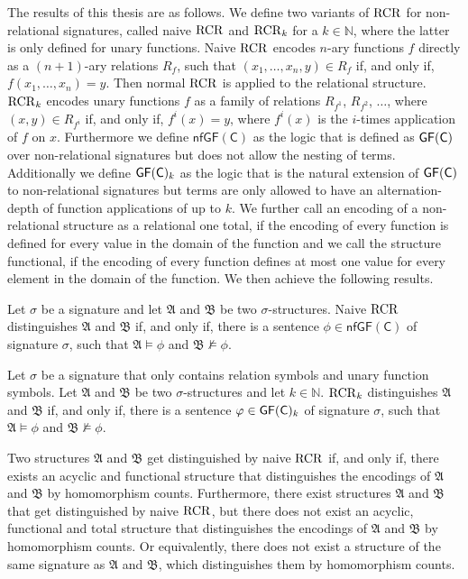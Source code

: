 The results of this thesis are as follows.
We define two variants of $\operatorname{RCR}$ for non-relational signatures, called naive $\operatorname{RCR}$ and $\operatorname{RCR}_k$ for a $k\in\mathbb{N}$, where the latter is only defined for unary functions.
Naive $\operatorname{RCR}$ encodes $n$-ary functions $f$ directly as a $(n+1)$-ary relations $R_f$, such that $(x_1,\dots,x_n,y)\in R_f$ if, and only if, $f(x_1,\dots,x_n)=y$.
Then normal $\operatorname{RCR}$ is applied to the relational structure.
$\operatorname{RCR}_k$ encodes unary functions $f$ as a family of relations $R_{f^1}$, $R_{f^2}$, $\dots$, where $(x,y)\in R_{f^i}$ if, and only if, $f^i(x)=y$, where $f^i(x)$ is the $i$-times application of $f$ on $x$.
Furthermore we define $\mathsf{nfGF}(\mathsf C)$ as the logic that is defined as $\mathsf{GF}(\mathsf{C})$ over non-relational signatures but does not allow the nesting of terms. 
Additionally we define $\mathsf{GF}(\mathsf{C})_k$ as the logic that is the natural extension of $\mathsf{GF}(\mathsf{C})$ to non-relational signatures but terms are only allowed to have an alternation-depth of function applications of up to $k$.
We further call an encoding of a non-relational structure as a relational one total, if the encoding of every function is defined for every value in the domain of the function and we call the structure functional, if the encoding of every function defines at most one value for every element in the domain of the function.
We then achieve the following results.

\begin{theorem}
Let $\sigma$ be a signature and let $\mathfrak A$ and $\mathfrak B$ be two $\sigma$-structures.
Naive $\operatorname{RCR}$ distinguishes $\mathfrak A$ and $\mathfrak B$ if, and only if, there is a sentence $\phi\in \mathsf{nfGF}(\mathsf C)$ of signature $\sigma$, such that $\mathfrak A\models \phi$ and $\mathfrak B\not\models \phi$.
\end{theorem}

\begin{theorem}
Let $\sigma$ be a signature that only contains relation symbols and unary function symbols. 
Let $\mathfrak A$ and $\mathfrak B$ be two $\sigma$-structures and let $k\in\mathbb N$. 
$\operatorname{RCR}_k$ distinguishes $\mathfrak A$ and $\mathfrak B$ if, and only if, there is a sentence $\varphi\in \mathsf{GF}(\mathsf{C})_k$ of signature $\sigma$, such that $\mathfrak A\models \phi$ and $\mathfrak B\not\models \phi$.
\end{theorem}

\begin{theorem}
\label{thm:introHomCount}
Two structures $\mathfrak A$ and $\mathfrak B$ get distinguished by naive $\operatorname{RCR}$ if, and only if, there exists an acyclic and functional structure that distinguishes the encodings of $\mathfrak A$ and $\mathfrak B$ by homomorphism counts.
Furthermore, there exist structures $\mathfrak A$ and $\mathfrak B$ that get distinguished by naive $\operatorname{RCR}$, but there does not exist an acyclic, functional and total structure that distinguishes the encodings of $\mathfrak A$ and $\mathfrak B$ by homomorphism counts.
Or equivalently, there does not exist a structure of the same signature as $\mathfrak A$ and $\mathfrak B$, which distinguishes them by homomorphism counts.
\end{theorem}

